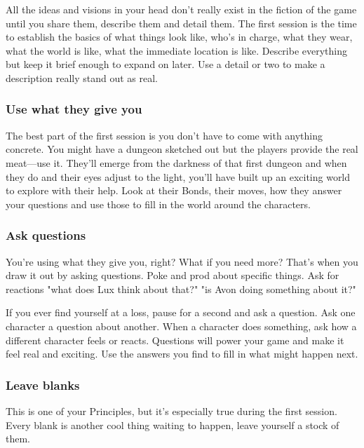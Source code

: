 All the ideas and visions in your head don't really exist in the fiction of the game until you share them, describe them and detail them. The first session is the time to establish the basics of what things look like, who's in charge, what they wear, what the world is like, what the immediate location is like. Describe everything but keep it brief enough to expand on later. Use a detail or two to make a description really stand out as real.

       
\subsubsection{Use what they give you}   
       

The best part of the first session is you don't have to come with anything concrete. You might have a dungeon sketched out but the players provide the real meat—use it. They'll emerge from the darkness of that first dungeon and when they do and their eyes adjust to the light, you'll have built up an exciting world to explore with their help. Look at their Bonds, their moves, how they answer your questions and use those to fill in the world around the characters.

       
\subsubsection{Ask questions}   
       

You're using what they give you, right? What if you need more? That's when you draw it out by asking questions. Poke and prod about specific things. Ask for reactions "what does Lux think about that?" "is Avon doing something about it?"

       

If you ever find yourself at a loss, pause for a second and ask a question. Ask one character a question about another. When a character does something, ask how a different character feels or reacts. Questions will power your game and make it feel real and exciting. Use the answers you find to fill in what might happen next.

       
\subsubsection{Leave blanks}    
       

This is one of your Principles, but it's especially true during the first session. Every blank is another cool thing waiting to happen, leave yourself a stock of them.

